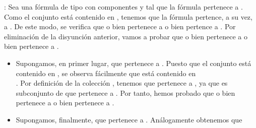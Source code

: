 \begin{isabellebody}
\begin{isamarkuptext}
\begin{demostracion}
  : Sea una fórmula de tipo \isa{{\isasymbeta}} con componentes  y
     tal que la fórmula pertenece a . Como el conjunto  está contenido en , tenemos 
    que la fórmula pertence, a su vez, a . De este modo, se verifica que o bien 
    pertenece a  o bien  pertence a . Por eliminación de la disyunción anterior, 
    vamos a probar que o bien  pertenece a  o bien  pertenece a .
    \begin{itemize}
      \item Supongamos, en primer lugar, que  pertenece a . Puesto que el conjunto 
      está contenido en , se observa fácilmente que  está contenido en\\ .
      Por definición de la colección , tenemos que  pertenece a , ya que es
      subconjunto de  que pertenece a . Por tanto, hemos probado que o bien  
      pertenece a  o bien  pertenece a .
      \item Supongamos, finalmente, que  pertenece a . Análogamente obtenemos que

\end{itemize}
\end{demostracion}
\end{isamarkuptext}
\end{isabellebody}
